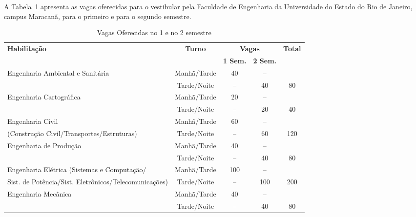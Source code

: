 A Tabela~\ref{tabvagas} apresenta as vagas oferecidas para o vestibular pela Faculdade de Engenharia da Universidade do Estado do Rio de Janeiro, campus Maracanã, para o primeiro e para o segundo semestre.
\begin{table}
\centering
\caption{Vagas Oferecidas no 1\textordmasculine{} e no 2\textordmasculine{} semestre}
\label{tabvagas}
  \begin{tabularx}{\textwidth}{|X|c|c|c|c|}
	\hline
	\multirow{2}{*}{\textbf{Habilitação}}& \multirow{2}{*}{\textbf{Turno}} & \multicolumn{2}{c|}{\textbf{Vagas}} & \multirow{2}{*}{\textbf{Total}}\\
	\cline{3-4}& & \textbf{1\textordmasculine{} Sem.}                     & \textbf{2\textordmasculine{} Sem.}                &     \\
		\hline
		Engenharia Ambiental e Sanitária & Manhã/Tarde & 40 & --&     \\
		                                 & Tarde/Noite & -- & 40 & 80 \\
		\hline
		Engenharia Cartográfica          & Manhã/Tarde & 20 & -- &    \\
		                                 & Tarde/Noite & -- & 20 & 40 \\
		\hline
		Engenharia Civil                 & Manhã/Tarde & 60 & -- &    \\
		(Construção Civil/Transportes/Estruturas) & Tarde/Noite & -- & 60 & 120 \\
		\hline
		Engenharia de Produção           & Manhã/Tarde & 40 & --&     \\
		                                 & Tarde/Noite & -- & 40 & 80  \\
		\hline
		Engenharia Elétrica (Sistemas e Computação/ & Manhã/Tarde& 100 & --  &     \\
		Sist. de Potência/Sist. Eletrônicos/Telecomunicações) & Tarde/Noite & -- & 100  & 200 \\
		\hline
		Engenharia Mecânica              & Manhã/Tarde & 40 & -- &     \\
		                                 & Tarde/Noite & -- & 40 & 80  \\
		\hline
	\end{tabularx}
\end{table}
